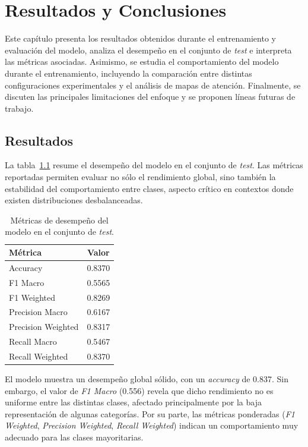 \chapter{Resultados y Conclusiones}

Este capítulo presenta los resultados obtenidos durante el entrenamiento y evaluación del modelo, analiza el desempeño en el conjunto de \textit{test} e interpreta las métricas asociadas. Asimismo, se estudia el comportamiento del modelo durante el entrenamiento, incluyendo la comparación entre distintas configuraciones experimentales y el análisis de mapas de atención. Finalmente, se discuten las principales limitaciones del enfoque y se proponen líneas futuras de trabajo.

\section{Resultados}

La tabla~\ref{tab:test_metrics} resume el desempeño del modelo en el conjunto de \textit{test}. Las métricas reportadas permiten evaluar no sólo el rendimiento global, sino también la estabilidad del comportamiento entre clases, aspecto crítico en contextos donde existen distribuciones desbalanceadas.

\begin{table}[H]
    \centering
    \caption{Métricas de desempeño del modelo en el conjunto de \textit{test}.}
    \label{tab:test_metrics}
    \begin{tabular}{l c}
        \toprule
        \textbf{Métrica} & \textbf{Valor} \\
        \midrule
        Accuracy                & 0.8370 \\
        F1 Macro                & 0.5565 \\
        F1 Weighted             & 0.8269 \\
        Precision Macro         & 0.6167 \\
        Precision Weighted      & 0.8317 \\
        Recall Macro            & 0.5467 \\
        Recall Weighted         & 0.8370 \\
        \bottomrule
    \end{tabular}
\end{table}

El modelo muestra un desempeño global sólido, con un \textit{accuracy} de 0.837. Sin embargo, el valor de \textit{F1 Macro} (0.556) revela que dicho rendimiento no es uniforme entre las distintas clases, afectado principalmente por la baja representación de algunas categorías. Por su parte, las métricas ponderadas (\textit{F1 Weighted}, \textit{Precision Weighted}, \textit{Recall Weighted}) indican un comportamiento muy adecuado para las clases mayoritarias.

